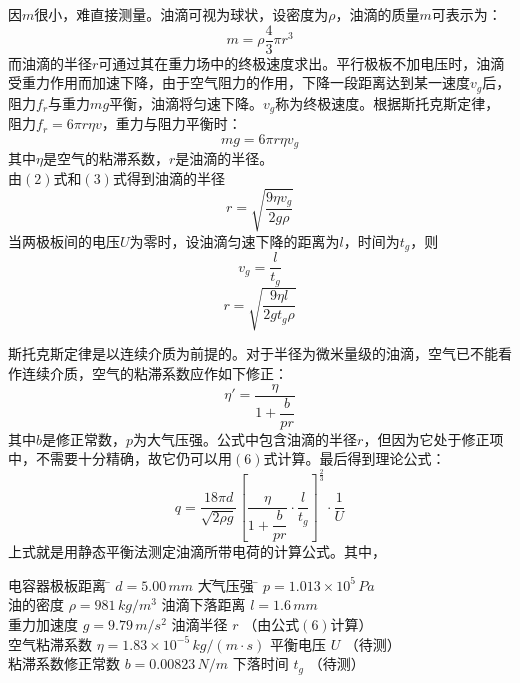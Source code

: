 \documentclass[11pt]{article}
\begin{document}
因$m$很小，难直接测量。油滴可视为球状，设密度为$\rho$，油滴的质量$m$可表示为：
\begin{equation}
    m=\rho\dfrac{4}{3}\pi r^3
\end{equation}
而油滴的半径$r$可通过其在重力场中的终极速度求出。平行极板不加电压时，油滴受重力作用而加速下降，由于空气阻力的作用，下降一段距离达到某一速度$v_g$后，阻力$f_r$与重力$mg$平衡，油滴将匀速下降。$v_g$称为终极速度。根据斯托克斯定律，阻力$f_r=6\pi r\eta v$，重力与阻力平衡时：
\begin{equation}
    mg=6\pi r\eta v_g
\end{equation}
其中$\eta$是空气的粘滞系数，$r$是油滴的半径。\\
由$(2)$式和$(3)$式得到油滴的半径
\begin{equation}
    r=\sqrt{\dfrac{9\eta v_g}{2g\rho}}
\end{equation}
当两极板间的电压$U$为零时，设油滴匀速下降的距离为$l$，时间为$t_g$，则
\begin{equation}
    v_g=\dfrac{l}{t_g}
\end{equation}
\begin{equation}
    r=\sqrt{\dfrac{9\eta l}{2gt_g\rho}}
\end{equation}

斯托克斯定律是以连续介质为前提的。对于半径为微米量级的油滴，空气已不能看作连续介质，空气的粘滞系数应作如下修正：
\begin{equation}
    \eta'=\dfrac{\eta}{1+\dfrac{b}{pr}}
\end{equation}
其中$b$是修正常数，$p$为大气压强。公式中包含油滴的半径$r$，但因为它处于修正项中，不需要十分精确，故它仍可以用$(6)$式计算。最后得到理论公式：
\begin{equation}
    q=\dfrac{18\pi d}{\sqrt{2\rho g}}\left[\dfrac{\eta}{1+\dfrac{b}{pr}}\cdot\dfrac{l}{t_g}\right]^{\frac{2}{3}}\cdot\dfrac{1}{U}
\end{equation}
上式就是用静态平衡法测定油滴所带电荷的计算公式。其中，
\begin{center}
    \begin{minipage}{0.5\textwidth} %
        \begin{tabbing}
            电容器极板距离\hspace{2em} \= $d=5.00\,mm$\hspace{7em} \= 大气压强\hspace{3em} \= $p=1.013\times10^5\,Pa$ \\
            油的密度 \> $\rho=981\,kg/m^3$ \> 油滴下落距离 \> $l=1.6\,mm$ \\
            重力加速度 \> $g=9.79\,m/s^2$ \> 油滴半径 \> $r$ （由公式$(6)$计算） \\
            空气粘滞系数 \> $\eta=1.83\times10^{-5}\,kg/(m\cdot s)$ \> 平衡电压 \> $U$ （待测） \\
            粘滞系数修正常数 \> $b=0.00823\,N/m$ \> 下落时间 \> $t_g$ （待测）
        \end{tabbing}
    \end{minipage}
\end{center}
\end{document}
